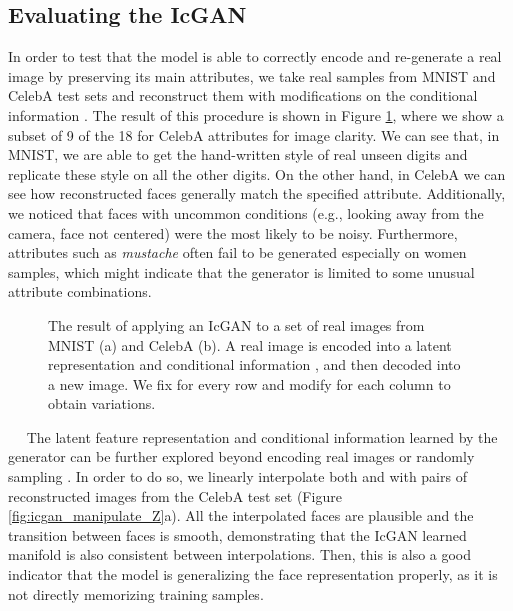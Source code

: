 \documentclass{article}
\newcommand{\minisection}[1]{\vspace{0.04in} \noindent {\bf #1}\ \ }
\begin{document}
\subsection{Evaluating the IcGAN}

In order to test that the model is able to correctly encode and re-generate a real image by preserving its main attributes, we take real samples from MNIST and CelebA test sets and reconstruct them with modifications on the conditional information . The result of this procedure is shown in Figure \ref{fig:icgan_analogies}, where we show a subset of 9 of the 18 for CelebA attributes for image clarity. We can see that, in MNIST, we are able to get the hand-written style of real unseen digits and replicate these style on all the other digits. On the other hand, in CelebA we can see how reconstructed faces generally match the specified attribute. Additionally, we noticed that faces with uncommon conditions (e.g., looking away from the camera, face not centered) were the most likely to be noisy. Furthermore, attributes such as \textit{mustache} often fail to be generated especially on women samples, which might indicate that the generator is limited to some unusual attribute combinations. 

\begin{figure}[t]
		\centering
        \newline
        \caption{The result of applying an IcGAN to a set of real images from MNIST (a) and CelebA (b). A real image is encoded into a latent representation  and conditional information , and then decoded into a new image. We fix  for every row and modify  for each column to obtain variations.} \label{fig:icgan_analogies}
\end{figure}

\minisection{Manipulating the latent space} \label{exp:icgan:latent}
The latent feature representation  and conditional information  learned by the generator can be further explored beyond encoding real images or randomly sampling . In order to do so, we linearly interpolate both  and  with pairs of reconstructed images from the CelebA test set (Figure \ref{fig:icgan_manipulate_Z}a). All the interpolated faces are plausible and the transition between faces is smooth, demonstrating that the IcGAN learned manifold is also consistent between interpolations. Then, this is also a good indicator that the model is generalizing the face representation properly, as it is not directly memorizing training samples.
\end{document}
